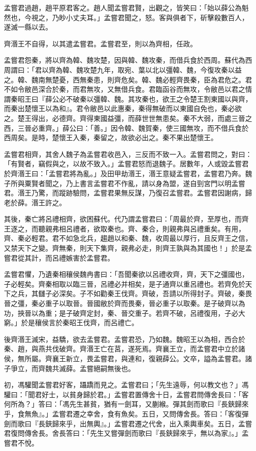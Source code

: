 \begin{pinyinscope}
孟嘗君過趙，趙平原君客之。趙人聞孟嘗君賢，出觀之，皆笑曰：「始以薛公為魁然也，今視之，乃眇小丈夫耳。」孟嘗君聞之，怒。客與俱者下，斫擊殺數百人，遂滅一縣以去。

齊湣王不自得，以其遣孟嘗君。孟嘗君至，則以為齊相，任政。

孟嘗君怨秦，將以齊為韓、魏攻楚，因與韓、魏攻秦，而借兵食於西周。蘇代為西周謂曰：「君以齊為韓、魏攻楚九年，取宛、葉以北以彊韓、魏，今復攻秦以益之。韓、魏南無楚憂，西無秦患，則齊危矣。韓、魏必輕齊畏秦，臣為君危之。君不如令敝邑深合於秦，而君無攻，又無借兵食。君臨函谷而無攻，令敝邑以君之情謂秦昭王曰『薛公必不破秦以彊韓、魏。其攻秦也，欲王之令楚王割東國以與齊，而秦出楚懷王以為和』。君令敝邑以此惠秦，秦得無破而以東國自免也，秦必欲之。楚王得出，必德齊。齊得東國益彊，而薛世世無患矣。秦不大弱，而處三晉之西，三晉必重齊。」薛公曰：「善。」因令韓、魏賀秦，使三國無攻，而不借兵食於西周矣。是時，楚懷王入秦，秦留之，故欲必出之。秦不果出楚懷王。

孟嘗君相齊，其舍人魏子為孟嘗君收邑入，三反而不致一入。孟嘗君問之，對曰：「有賢者，竊假與之，以故不致入。」孟嘗君怒而退魏子。居數年，人或毀孟嘗君於齊湣王曰：「孟嘗君將為亂。」及田甲劫湣王，湣王意疑孟嘗君，孟嘗君乃奔。魏子所與粟賢者聞之，乃上書言孟嘗君不作亂，請以身為盟，遂自剄宮門以明孟嘗君。湣王乃驚，而蹤跡驗問，孟嘗君果無反謀，乃復召孟嘗君。孟嘗君因謝病，歸老於薛。湣王許之。

其後，秦亡將呂禮相齊，欲困蘇代。代乃謂孟嘗君曰：「周最於齊，至厚也，而齊王逐之，而聽親弗相呂禮者，欲取秦也。齊、秦合，則親弗與呂禮重矣。有用，齊、秦必輕君。君不如急北兵，趨趙以和秦、魏，收周最以厚行，且反齊王之信，又禁天下之變。齊無秦，則天下集齊，親弗必走，則齊王孰與為其國也！」於是孟嘗君從其計，而呂禮嫉害於孟嘗君。

孟嘗君懼，乃遺秦相穰侯魏冉書曰：「吾聞秦欲以呂禮收齊，齊，天下之彊國也，子必輕矣。齊秦相取以臨三晉，呂禮必并相矣，是子通齊以重呂禮也。若齊免於天下之兵，其讎子必深矣。子不如勸秦王伐齊。齊破，吾請以所得封子。齊破，秦畏晉之彊，秦必重子以取晉。晉國敝於齊而畏秦，晉必重子以取秦。是子破齊以為功，挾晉以為重；是子破齊定封，秦、晉交重子。若齊不破，呂禮復用，子必大窮。」於是穰侯言於秦昭王伐齊，而呂禮亡。

後齊湣王滅宋，益驕，欲去孟嘗君。孟嘗君恐，乃如魏。魏昭王以為相，西合於秦、趙，與燕共伐破齊。齊湣王亡在莒，遂死焉。齊襄王立，而孟嘗君中立於諸侯，無所屬。齊襄王新立，畏孟嘗君，與連和，復親薛公。文卒，謚為孟嘗君。諸子爭立，而齊魏共滅薛。孟嘗絕嗣無後也。

初，馮驩聞孟嘗君好客，躡蹻而見之。孟嘗君曰；「先生遠辱，何以教文也？」馮驩曰：「聞君好士，以貧身歸於君。」孟嘗君置傳舍十日，孟嘗君問傳舍長曰：「客何所為？」答曰：「馮先生甚貧，猶有一劍耳，又蒯緱。彈其劍而歌曰『長鋏歸來乎，食無魚』。」孟嘗君遷之幸舍，食有魚矣。五日，又問傳舍長。答曰：「客復彈劍而歌曰『長鋏歸來乎，出無輿』。」孟嘗君遷之代舍，出入乘輿車矣。五日，孟嘗君復問傳舍長。舍長答曰：「先生又嘗彈劍而歌曰『長鋏歸來乎，無以為家』。」孟嘗君不悅。


\end{pinyinscope}
